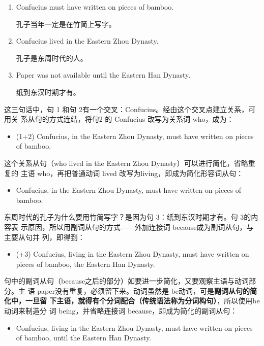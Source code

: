 \begin{enumerate}
\item Confucius must have written on pieces of bamboo.

  孔子当年一定是在竹简上写字。
\item Confucius lived in the Eastern Zhou Dynasty.

  孔子是东周时代的人。
\item Paper was not available until the Eastern Han Dynasty.

  纸到东汉时期才有。
\end{enumerate}

这三句话中，句 1 和句 2有一个交叉：Confucius。经由这个交叉点建立关系，可用关
系从句的方式连结，将句2 的 Confucius 改写为关系词 who，成为：
\begin{itemize}
\item (1+2) Confucius,  in the Eastern Zhou Dynasty, must have
  written on pieces of bamboo.
\end{itemize}
这个关系从句（who lived in the Eastern Zhou Dynasty）可以进行简化，省略重复的
主语 who，再把普通动词 lived 改写为living，即成为简化形容词从句：
\begin{itemize}
\item Confucius,  in the Eastern Zhou Dynasty, must have written on
  pieces of bamboo.
\end{itemize}
东周时代的孔子为什么要用竹简写字？是因为句 3：纸到东汉时期才有。句 3的内容表
示原因，所以用副词从句的方式——外加连接词 because成为副词从句，与主要从句并
列，即得到：
\begin{itemize}
\item (+3) Confucius, living in the Eastern Zhou Dynasty, must have written on
  pieces of bamboo,  the Eastern Han Dynasty.
\end{itemize}

句中的副词从句（because之后的部分）如要进一步简化，又要观察主语与动词部分。主
语 paper没有重复，必须留下来。动词虽然是 be动词，可是\textbf{副词从句的简化中，一旦留
下主语，就得有个分词配合（传统语法称为分词构句）}，所以使用be 动词来制造分
词 being，并省略连接词 because，即成为简化的副词从句：

\begin{itemize}
\item Confucius, living in the Eastern Zhou Dynasty, must have written on
  pieces of bamboo,  until the Eastern Han Dynasty.
\end{itemize}

